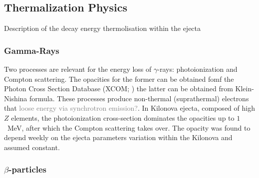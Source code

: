 \documentclass[11pt,a4paper,headinclude=true,DIV=14,BCOR=8mm,chapterprefix,listof=totoc,twoside,openright,abstracton]{scrbook}
\newcommand{\gray}[1]{\textcolor{gray}{#1}}
\begin{document}

\subsection{Thermalization Physics}

Description of the decay energy thermolisation within the ejecta

\subsubsection{Gamma-Rays}

Two processes are relevant for the energy loss of $\gamma$-rays: photoionization and Compton scattering. The opacities for the former can be obtained fomf the Photon Cross Section Database (XCOM; \cite{Berger et al. 2010})  the latter can be obtained from Klein-Nishina formula. These processes produce non-thermal (suprathermal) electrons that \gray{loose energy via synchrotron emission?}.
In Kilonova ejecta, composed of high $Z$ elements, the photoionization cross-section dominates the opacities up to $1$~MeV, after which the Compton scattering takes over. The opacity was found to depend weekly on the ejecta parameters variation within the Kilonova and assumed constant.

\subsubsection{$\beta$-particles}
\end{document}
